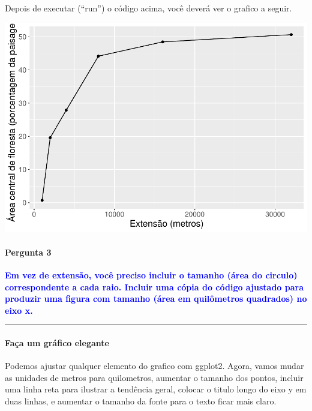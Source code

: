 \documentclass[
]{article}
\begin{document}
Depois de executar (``run'') o código acima, você deverá ver o grafico a seguir.

\begin{center}\includegraphics[width=0.5\linewidth,height=0.5\textheight]{epr_files/figure-latex/unnamed-chunk-36-1} \end{center}

\hypertarget{pergunta-3-1}{%
\paragraph{Pergunta 3}\label{pergunta-3-1}}

\textcolor{blue}{\textbf{Em vez de extensão, você preciso incluir o tamanho (área do circulo) correspondente a cada raio. Incluir uma cópia do código ajustado para produzir uma figura com tamanho (área em quilômetros quadrados) no eixo x.}}

\begin{center}\rule{0.5\linewidth}{0.5pt}\end{center}

\newpage

\hypertarget{fauxe7a-um-gruxe1fico-elegante}{%
\paragraph{Faça um gráfico elegante}\label{fauxe7a-um-gruxe1fico-elegante}}

Podemos ajustar qualquer elemento do grafico com ggplot2. Agora, vamos mudar as unidades de metros para quilometros, aumentar o tamanho dos pontos, incluir uma linha reta para ilustrar a tendência geral, colocar o titulo longo do eixo y em duas linhas, e aumentar o tamanho da fonte para o texto ficar mais claro.
\end{document}
